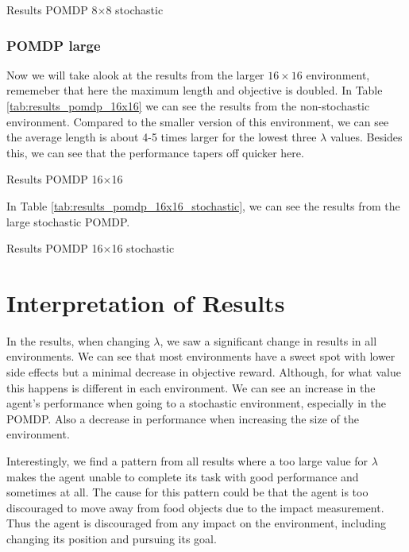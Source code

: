 \documentclass[12pt,A4]{report}
\theoremstyle{definition}
\begin{document}
\begin{table}[H]
  \centering
  \caption{Results POMDP 8$\times$8 stochastic}
  
  \label{tab:results_pomdp_8x8_stochastic}
\end{table}


\subsubsection{POMDP large}
Now we will take alook at the results from the larger $16\times16$ environment, rememeber that here the maximum length and objective is doubled. In Table \ref{tab:results_pomdp_16x16} we can see the results from the non-stochastic environment. Compared to the smaller version of this environment, we can see the average length is about 4-5 times larger for the lowest three $\lambda$ values. Besides this, we can see that the performance tapers off quicker here.

\begin{table}[H]
  \centering
  \caption{Results POMDP 16$\times$16}
  
  \label{tab:results_pomdp_16x16}
\end{table}

In Table \ref{tab:results_pomdp_16x16_stochastic}, we can see the results from the large stochastic POMDP. 

\begin{table}[H]
  \centering
  \caption{Results POMDP 16$\times$16 stochastic}
  
  \label{tab:results_pomdp_16x16_stochastic}
\end{table}


\section{Interpretation of Results}
In the results, when changing $\lambda$, we saw a significant change in results in all environments. We can see that most environments have a sweet spot with lower side effects but a minimal decrease in objective reward. Although, for what value this happens is different in each environment. We can see an increase in the agent's performance when going to a stochastic environment, especially in the POMDP. Also a decrease in performance when increasing the size of the environment.

Interestingly, we find a pattern from all results where a too large value for $\lambda$ makes the agent unable to complete its task with good performance and sometimes at all. The cause for this pattern could be that the agent is too discouraged to move away from food objects due to the impact measurement. Thus the agent is discouraged from any impact on the environment, including changing its position and pursuing its goal. 
\end{document}
